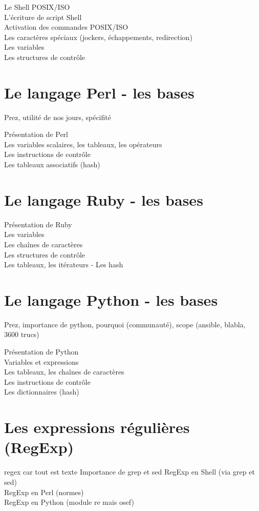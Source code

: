 \documentclass[11pt,a4paper]{article}
\begin{document}
Le Shell POSIX/ISO\\
L'écriture de script Shell \\
Activation des commandes POSIX/ISO\\
Les caractères spéciaux (jockers, échappements, redirection)\\
Les variables\\
Les structures de contrôle\\

\section{Le langage Perl - les bases}
Prez, utilité de nos jours, spécifité

Présentation de Perl\\
Les variables scalaires, les tableaux, les opérateurs\\
Les instructions de contrôle\\
Les tableaux associatifs (hash)\\

\section{Le langage Ruby - les bases}
Présentation de Ruby\\
Les variables\\
Les chaînes de caractères\\
Les structures de contrôle\\
Les tableaux, les itérateurs - Les hash\\

\section{Le langage Python - les bases}
Prez, importance de python, pourquoi (communauté), scope (ansible, blabla, 3600 trucs)

Présentation de Python\\
Variables et expressions\\
Les tableaux, les chaînes de caractères\\
Les instructions de contrôle\\
Les dictionnaires (hash)\\

\section{Les expressions régulières (RegExp)}
regex car tout est texte
Importance de grep et sed 
RegExp en Shell (via grep et sed)\\
RegExp en Perl (normes)\\
RegExp en Python (module re mais osef)\\
\end{document}
